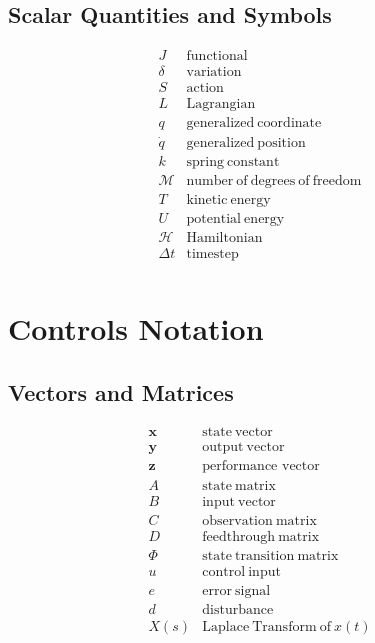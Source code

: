 \subsection*{Scalar Quantities and Symbols}
$$\begin{array}{cl}
     J&  \mathrm{functional}\\
     \delta&\mathrm{variation}\\
      S& \mathrm{action}\\
      L & \mathrm{Lagrangian}\\
              q& \mathrm{generalized \ coordinate}\\
         \dot{q}& \mathrm{generalized \ position}\\
       k& \mathrm{spring \ constant}\\
        \mathcal{M}& \mathrm{number\ of\ degrees\ of\ freedom}\\
     T& \mathrm{kinetic \ energy}\\
      U& \mathrm{potential \ energy}\\
    \mathcal{H}& \mathrm{Hamiltonian}\\
        \Delta t& \mathrm{timestep}\\
\end{array}$$
\newpage
\section*{Controls Notation}
\subsection*{Vectors and Matrices}
$$\begin{array}{cl}
      {\bm{x}}& \mathrm{state\ vector}\\
        \bm{y}&\mathrm{output \ vector}\\
        \bm{z}&\text{performance vector}\\
      A & \mathrm{state \ matrix}\\
      B & \mathrm{input\ vector}\\
      C & \mathrm{observation\ matrix}\\
      D & \mathrm{feedthrough\ matrix}\\
      \Phi & \mathrm{state\ transition \ matrix}\\
      u& \mathrm{control \ input} \\
      e& \mathrm{error \ signal}\\
      d& \mathrm{disturbance}\\
      X(s)&\mathrm{Laplace \ Transform \ of \ } x(t)
\end{array}$$
